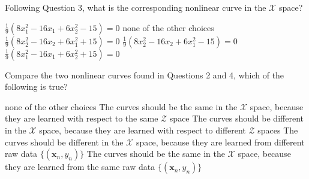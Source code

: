 \documentclass[a4paper,10pt]{exam}
\begin{document}
\begin{questions}
	 \question Following Question 3, what is the corresponding nonlinear curve in the $\mathcal{X}$ space?
	 \begin{choices}
	 	\CorrectChoice $\frac{1}{9}(8x_1^2-16x_1+6x_2^2 - 15) = 0$
	 	\choice none of the other choices
	 	\choice $\frac{1}{9}(8x_2^2-16x_2+6x_1^2 + 15) = 0$
	 	\choice $\frac{1}{9}(8x_2^2-16x_2+6x_1^2 - 15) = 0$
	 	\choice $\frac{1}{9}(8x_1^2-16x_1+6x_2^2 + 15) = 0$\\
	 \end{choices}
	 
	\question Compare the two nonlinear curves found in Questions 2 and 4, which of the following is true?
	\begin{choices}
		\choice none of the other choices
		\choice The curves should be the same in the $\mathcal{X}$ space, because they are learned with respect to the same $\mathcal{Z}$ space
		\CorrectChoice The curves should be different in the $\mathcal{X}$ space, because they are learned with respect to different $\mathcal{Z}$ spaces
		\choice The curves should be different in the $\mathcal{X}$ space, because they are learned from different raw data $\{(\mathbf{x}_n, y_n)\}$
		\choice The curves should be the same in the $\mathcal{X}$ space, because they are learned from the same raw data $\{(\mathbf{x}_n, y_n)\}$\\
	\end{choices}

\end{questions}
\end{document}
